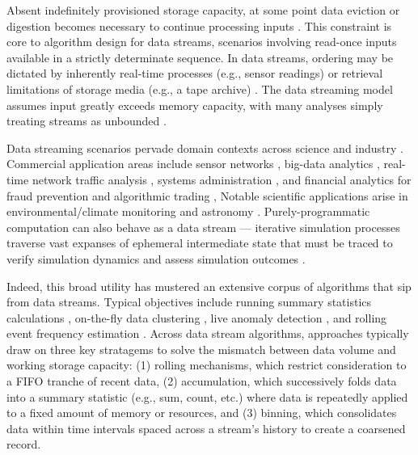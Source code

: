 Absent indefinitely provisioned storage capacity, at some point data eviction or digestion becomes necessary to continue processing inputs \citep{gaber2005mining}.
This constraint is core to algorithm design for data streams, scenarios involving read-once inputs available in a strictly determinate sequence.
In data streams, ordering may be dictated by inherently real-time processes (e.g., sensor readings) or retrieval limitations of storage media (e.g., a tape archive) \citep{henzinger1998computing}.
The data streaming model assumes input greatly exceeds memory capacity, with many analyses simply treating streams as unbounded \citep{jiang2006research}.

Data streaming scenarios pervade domain contexts across science and industry \citep{aggarwal2009data,akidau2015dataflow}.
Commercial application areas include sensor networks \citep{elnahrawy2003research}, big-data analytics \citep{he2010comet}, real-time network traffic analysis \citep{johnson2005streams,muthukrishnan2005data}, systems administration \citep{fischer2012real}, and financial analytics for fraud prevention and algorithmic trading \citep{rajeshwari2016real,agarwal2009faster},
Notable scientific applications arise in environmental/climate monitoring \citep{hill2009real} and astronomy \citep{graham2012data}.
Purely-programmatic computation can also behave as a data stream --- iterative simulation processes traverse vast expanses of ephemeral intermediate state that must be traced to verify simulation dynamics and assess simulation outcomes \citep{abdulla2004simulation,schutzel2014stream}.

Indeed, this broad utility has mustered an extensive corpus of algorithms that sip from data streams.
Typical objectives include running summary statistics calculations \citep{lin2004continuously}, on-the-fly data clustering \citep{silva2013data}, live anomaly detection \citep{cai2004maids}, and rolling event frequency estimation \citep{manku2002approximate}.
Across data stream algorithms, approaches typically draw on three key stratagems to solve the mismatch between data volume and working storage capacity: (1) rolling mechanisms, which restrict consideration to a FIFO tranche of recent data, (2) accumulation, which successively folds data into a summary statistic (e.g., sum, count, etc.) where data is repeatedly applied to a fixed amount of memory or resources, and (3) binning, which consolidates data within time intervals spaced across a stream's history to create a coarsened record.

